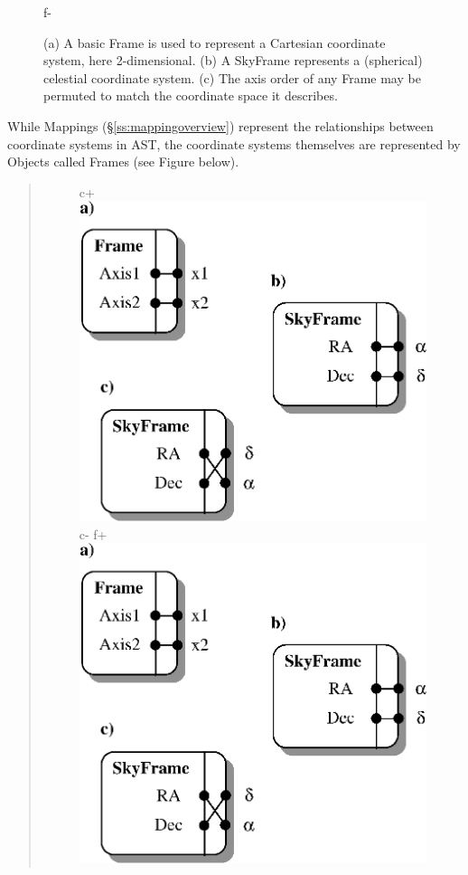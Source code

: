 \documentclass[twoside,11pt]{article}
\newenvironment{latexonly}{}{}
\newcommand{\secref}[1]{\S\ref{#1}}
\newcommand{\secref}[1]{\ref{#1}}
\begin{document}
\begin{latexonly}
\begin{figure}
\begin{center}
f-
   \caption{(a) A basic Frame is used to represent a Cartesian coordinate
   system, here 2-dimensional. (b) A SkyFrame represents a (spherical)
   celestial coordinate system. (c) The axis order of any Frame may be
   permuted to match the coordinate space it describes.}
   \label{fig:frames}
   \end{center}
   \end{figure}
\end{latexonly}
\begin{htmlonly}
   While Mappings (\secref{ss:mappingoverview}) represent the
   relationships between coordinate systems in AST, the coordinate
   systems themselves are represented by Objects called Frames (see
   Figure below).
   \begin{quote}
   \begin{figure}
   \label{fig:frames}
c+
   \includegraphics[scale=1.5]{sun211_figures/frames.eps}
c-
f+
   \includegraphics[scale=1.5]{sun210_figures/frames.eps}

\end{figure}
\end{quote}
\end{htmlonly}
\end{document}
